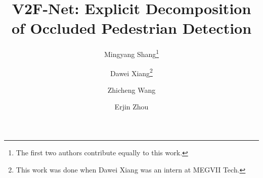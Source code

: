 \documentclass[10pt,twocolumn,letterpaper]{article}
\begin{document}
\title{V2F-Net: Explicit Decomposition of Occluded Pedestrian Detection}
\makeatletter
\renewcommand*{\@fnsymbol}[1]{\ensuremath{\ifcase#1\or *\or \dagger\or \ddagger\or
    \mathsection\or \mathparagraph\or \|\or **\or \dagger\dagger
    \or \ddagger\ddagger \else\@ctrerr\fi}}
\makeatother
\newcommand*\samethanks[1][\value{footnote}]{\footnotemark[#1]}


\author[1]{Mingyang Shang\thanks{The first two authors contribute equally to this work.}}
\author[1,2]{Dawei Xiang\samethanks\thanks{This work was done when Dawei Xiang was an intern at MEGVII Tech.}}
\author[1]{Zhicheng Wang}
\author[1]{Erjin Zhou}
\setlength{\affilsep}{0em}
\renewcommand\Authsep{\quad}
\renewcommand\Authand{\quad}
\renewcommand\Authands{\quad}


\maketitle
\end{document}
